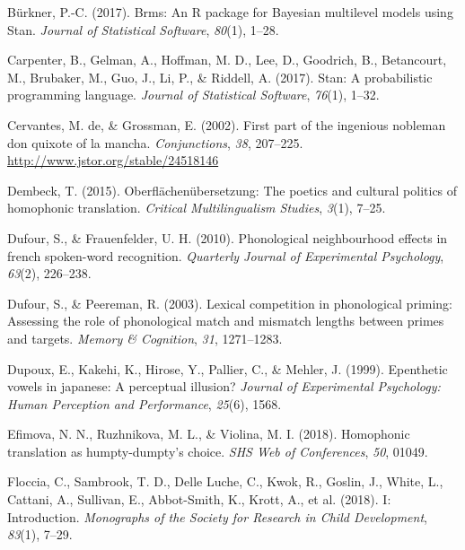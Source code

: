 \documentclass[
]{article}
\newlength{\cslhangindent}
\newenvironment{CSLReferences}[2] %
 {\begin{list}{}{%
  \setlength{\itemindent}{0pt}
  \setlength{\leftmargin}{0pt}
  \setlength{\parsep}{0pt}
  \ifodd #1
   \setlength{\leftmargin}{\cslhangindent}
   \setlength{\itemindent}{-1\cslhangindent}
  \fi
  \setlength{\itemsep}{#2\baselineskip}}}
 {\end{list}}
\begin{document}
\begin{CSLReferences}{1}{0}
Bürkner, P.-C. (2017). Brms: {An R} package for {Bayesian} multilevel
models using {Stan}. \emph{Journal of Statistical Software},
\emph{80}(1), 1--28.

Carpenter, B., Gelman, A., Hoffman, M. D., Lee, D., Goodrich, B.,
Betancourt, M., Brubaker, M., Guo, J., Li, P., \& Riddell, A. (2017).
Stan: {A} probabilistic programming language. \emph{Journal of
Statistical Software}, \emph{76}(1), 1--32.

Cervantes, M. de, \& Grossman, E. (2002). First part of the ingenious
nobleman don quixote of la mancha. \emph{Conjunctions}, \emph{38},
207--225. \url{http://www.jstor.org/stable/24518146}

Dembeck, T. (2015). Oberfl{ä}chen{ü}bersetzung: The poetics and cultural
politics of homophonic translation. \emph{Critical Multilingualism
Studies}, \emph{3}(1), 7--25.

Dufour, S., \& Frauenfelder, U. H. (2010). Phonological neighbourhood
effects in french spoken-word recognition. \emph{Quarterly Journal of
Experimental Psychology}, \emph{63}(2), 226--238.

Dufour, S., \& Peereman, R. (2003). Lexical competition in phonological
priming: {Assessing} the role of phonological match and mismatch lengths
between primes and targets. \emph{Memory \& Cognition}, \emph{31},
1271--1283.

Dupoux, E., Kakehi, K., Hirose, Y., Pallier, C., \& Mehler, J. (1999).
Epenthetic vowels in japanese: A perceptual illusion? \emph{Journal of
Experimental Psychology: Human Perception and Performance},
\emph{25}(6), 1568.

Efimova, N. N., Ruzhnikova, M. L., \& Violina, M. I. (2018). Homophonic
translation as humpty-dumpty's choice. \emph{SHS Web of Conferences},
\emph{50}, 01049.

Floccia, C., Sambrook, T. D., Delle Luche, C., Kwok, R., Goslin, J.,
White, L., Cattani, A., Sullivan, E., Abbot-Smith, K., Krott, A., et al.
(2018). I: {Introduction}. \emph{Monographs of the Society for Research
in Child Development}, \emph{83}(1), 7--29.


\end{CSLReferences}
\end{document}
